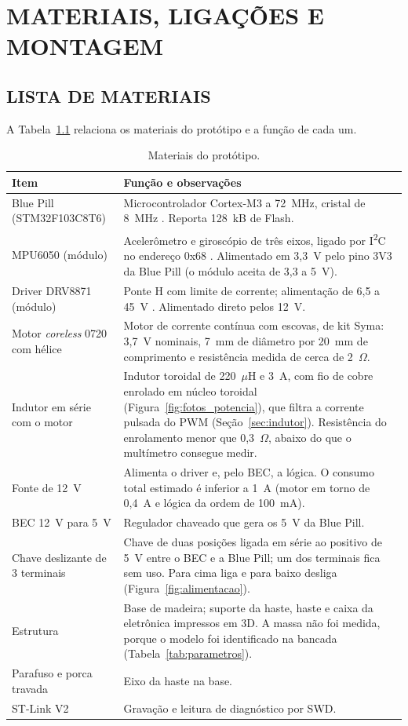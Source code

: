 \chapter{MATERIAIS, LIGAÇÕES E MONTAGEM}\label{cap:materiais}

\section{LISTA DE MATERIAIS}

A Tabela~\ref{tab:materiais} relaciona os materiais do protótipo e a função de cada um.

\begin{table}[H]
\centering\caption{Materiais do protótipo.}\label{tab:materiais}
\begin{tabularx}{\textwidth}{p{4.3cm}X}
\hline\textbf{Item} & \textbf{Função e observações}\\\hline
Blue Pill (STM32F103C8T6) & Microcontrolador Cortex-M3 a 72~MHz, cristal de 8~MHz \cite{stm32f103ds}. Reporta 128~kB de Flash.\\
MPU6050 (módulo) & Acelerômetro e giroscópio de três eixos, ligado por I\textsuperscript{2}C no endereço 0x68 \cite{mpu6050rm}. Alimentado em 3,3~V pelo pino 3V3 da Blue Pill (o módulo aceita de 3,3 a 5~V).\\
Driver DRV8871 (módulo) & Ponte H com limite de corrente; alimentação de 6,5 a 45~V \cite{drv8871ds}. Alimentado direto pelos 12~V.\\
Motor \textit{coreless} 0720 com hélice & Motor de corrente contínua com escovas, de kit Syma: 3,7~V nominais, 7~mm de diâmetro por 20~mm de comprimento e resistência medida de cerca de 2~$\Omega$.\\
Indutor em série com o motor & Indutor toroidal de 220~$\mu$H e 3~A, com fio de cobre enrolado em núcleo toroidal (Figura~\ref{fig:fotos_potencia}), que filtra a corrente pulsada do PWM (Seção~\ref{sec:indutor}). Resistência do enrolamento menor que 0,3~$\Omega$, abaixo do que o multímetro consegue medir.\\
Fonte de 12~V & Alimenta o driver e, pelo BEC, a lógica. O consumo total estimado é inferior a 1~A (motor em torno de 0,4~A e lógica da ordem de 100~mA).\\
BEC 12~V para 5~V & Regulador chaveado que gera os 5~V da Blue Pill.\\
Chave deslizante de 3 terminais & Chave de duas posições ligada em série ao positivo de 5~V entre o BEC e a Blue Pill; um dos terminais fica sem uso. Para cima liga e para baixo desliga (Figura~\ref{fig:alimentacao}).\\
Estrutura & Base de madeira; suporte da haste, haste e caixa da eletrônica impressos em 3D. A massa não foi medida, porque o modelo foi identificado na bancada (Tabela~\ref{tab:parametros}).\\
Parafuso e porca travada & Eixo da haste na base.\\
ST-Link V2 & Gravação e leitura de diagnóstico por SWD.\\\hline
\end{tabularx}
\end{table}

